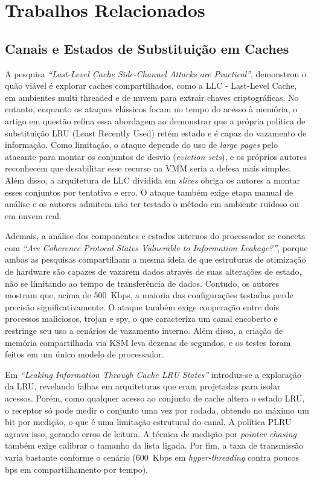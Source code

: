 \section{Trabalhos Relacionados}

\subsection{Canais e Estados de Substituição em Caches}

A pesquisa \textit{“Last-Level Cache Side-Channel Attacks are Practical”}\cite{7163050}, demonstrou o quão viável é explorar caches compartilhados, como a LLC - Last-Level Cache, em ambientes multi threaded e de nuvem para extrair chaves criptográficas. No entanto, enquanto os ataques clássicos focam no tempo do acesso à memória, o artigo em questão refina essa abordagem ao demonstrar que a própria política de substituição LRU (Least Recently Used) retém estado e é capaz do vazamento de informação. Como limitação, o ataque depende do uso de \textit{large pages} pelo atacante para montar os conjuntos de desvio (\textit{eviction sets}), e os próprios autores reconhecem que desabilitar esse recurso na VMM seria a defesa mais simples. Além disso, a arquitetura de LLC dividida em \textit{slices} obriga os autores a montar esses conjuntos por tentativa e erro. O ataque também exige etapa manual de análise e os autores admitem não ter testado o método em ambiente ruidoso ou em nuvem real.

Ademais, a análise dos componentes e estados internos do processador se conecta com \textit{“Are Coherence Protocol States Vulnerable to Information Leakage?”}\cite{8327007}, porque ambas as pesquisas compartilham a mesma ideia de que estruturas de otimização de hardware são capazes de vazarem dados através de suas alterações de estado, não se limitando ao tempo de transferência de dados. Contudo, os autores mostram que, acima de 500~Kbps, a maioria das configurações testadas perde precisão significativamente. O ataque também exige cooperação entre dois processos maliciosos, trojan e spy, o que caracteriza um canal encoberto e restringe seu uso a cenários de vazamento interno. Além disso, a criação de memória compartilhada via KSM leva dezenas de segundos, e os testes foram feitos em um único modelo de processador.

Em \textit{“Leaking Information Through Cache LRU States”}\cite{9065598} introduz-se a exploração da LRU, revelando falhas em arquiteturas que eram projetadas para isolar acessos. Porém, como qualquer acesso ao conjunto de cache altera o estado LRU, o receptor só pode medir o conjunto uma vez por rodada, obtendo no máximo um bit por medição, o que é uma limitação estrutural do canal. A política PLRU agrava isso, gerando erros de leitura. A técnica de medição por \textit{pointer chasing} também exige calibrar o tamanho da lista ligada. Por fim, a taxa de transmissão varia bastante conforme o cenário (600~Kbps em \textit{hyper-threading} contra poucos bps em compartilhamento por tempo).

